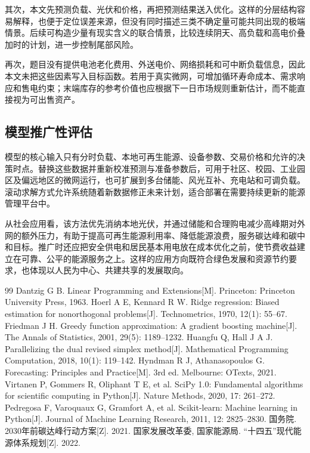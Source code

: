其次，本文先预测负载、光伏和价格，再把预测结果送入优化。这样的分层结构容易解释，也便于定位误差来源，但没有同时描述三类不确定量可能共同出现的极端情景。后续可构造少量有现实含义的联合情景，比较连续阴天、高负载和高电价叠加时的计划，进一步控制尾部风险。

再次，题目没有提供电池老化费用、外送电价、网络损耗和可中断负载信息，因此本文未把这些因素写入目标函数。若用于真实微网，可增加循环寿命成本、需求响应和售电约束；末端库存的参考价值也应根据下一日市场规则重新估计，而不能直接视为可出售资产。

\subsection{模型推广性评估}

模型的核心输入只有分时负载、本地可再生能源、设备参数、交易价格和允许的决策时点。替换这些数据并重新校准预测与准备参数后，可用于社区、校园、工业园区及偏远地区的微网运行，也可扩展到多台储能、风光互补、充电站和可调负载。滚动求解方式允许系统随着新数据修正未来计划，适合部署在需要持续更新的能源管理平台中。

从社会应用看，该方法优先消纳本地光伏，并通过储能和合理购电减少高峰期对外网的额外压力，有助于提高可再生能源利用率、降低能源浪费，服务碳达峰和碳中和目标\cite{carbonplan,energyplan}。推广时还应把安全供电和居民基本用电放在成本优化之前，使节费收益建立在可靠、公平的能源服务之上。这样的应用方向既符合绿色发展和资源节约要求，也体现以人民为中心、共建共享的发展取向。

\newpage
\begin{thebibliography}{99}
 Dantzig G B. Linear Programming and Extensions[M]. Princeton: Princeton University Press, 1963.
 Hoerl A E, Kennard R W. Ridge regression: Biased estimation for nonorthogonal problems[J]. Technometrics, 1970, 12(1): 55--67.
 Friedman J H. Greedy function approximation: A gradient boosting machine[J]. The Annals of Statistics, 2001, 29(5): 1189--1232.
 Huangfu Q, Hall J A J. Parallelizing the dual revised simplex method[J]. Mathematical Programming Computation, 2018, 10(1): 119--142.
 Hyndman R J, Athanasopoulos G. Forecasting: Principles and Practice[M]. 3rd ed. Melbourne: OTexts, 2021.
 Virtanen P, Gommers R, Oliphant T E, et al. SciPy 1.0: Fundamental algorithms for scientific computing in Python[J]. Nature Methods, 2020, 17: 261--272.
 Pedregosa F, Varoquaux G, Gramfort A, et al. Scikit-learn: Machine learning in Python[J]. Journal of Machine Learning Research, 2011, 12: 2825--2830.
 国务院. 2030年前碳达峰行动方案[Z]. 2021.
 国家发展改革委, 国家能源局. “十四五”现代能源体系规划[Z]. 2022.
\end{thebibliography}
